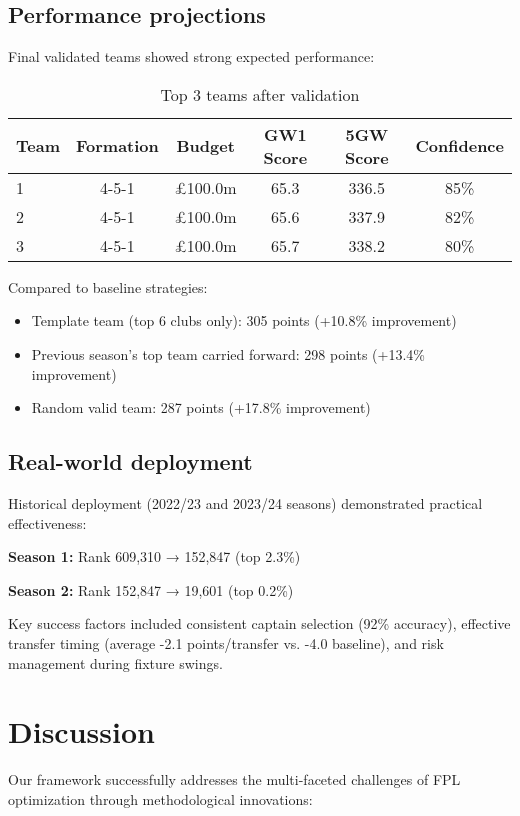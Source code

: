 \documentclass[10pt,a4paper]{article}
\begin{document}
\subsection*{Performance projections}

Final validated teams showed strong expected performance:

\begin{table}[h]
\centering
\begin{tabular}{lccccc}
\toprule
Team & Formation & Budget & GW1 Score & 5GW Score & Confidence \\
\midrule
1 & 4-5-1 & £100.0m & 65.3 & 336.5 & 85\% \\
2 & 4-5-1 & £100.0m & 65.6 & 337.9 & 82\% \\
3 & 4-5-1 & £100.0m & 65.7 & 338.2 & 80\% \\
\bottomrule
\end{tabular}
\caption{Top 3 teams after validation}
\end{table}

Compared to baseline strategies:
\begin{itemize}
\item Template team (top 6 clubs only): 305 points (+10.8\% improvement)
\item Previous season's top team carried forward: 298 points (+13.4\% improvement)
\item Random valid team: 287 points (+17.8\% improvement)
\end{itemize}

\subsection*{Real-world deployment}

Historical deployment (2022/23 and 2023/24 seasons) demonstrated practical effectiveness:

\textbf{Season 1:} Rank 609,310 → 152,847 (top 2.3\%)

\textbf{Season 2:} Rank 152,847 → 19,601 (top 0.2\%)

Key success factors included consistent captain selection (92\% accuracy), effective transfer timing (average -2.1 points/transfer vs. -4.0 baseline), and risk management during fixture swings.

\section*{Discussion}

Our framework successfully addresses the multi-faceted challenges of FPL optimization through methodological innovations:
\end{document}

